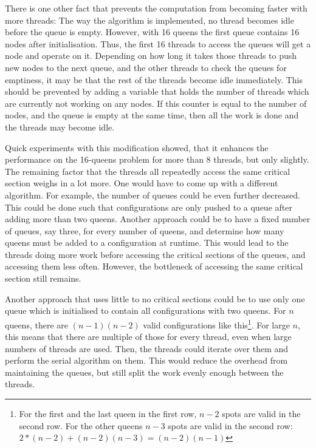 There is one other fact that prevents the computation from becoming faster with more threads:
The way the algorithm is implemented, no thread becomes idle before the queue is empty.
However, with 16 queens the first queue contains 16 nodes after initialisation.
Thus, the first 16 threads to access the queues will get a node and operate on it.
Depending on how long it takes those threads to push new nodes to the next queue, and the other threads to check the queues for emptiness, it may be that the rest of the threads become idle immediately.
This should be prevented by adding a variable that holds the number of threads which are currently not working on any nodes.
If this counter is equal to the number of nodes, and the queue is empty at the same time, then all the work is done and the threads may become idle.

Quick experiments with this modification showed, that it enhances the performance on the 16-queens problem for more than 8 threads, but only slightly.
The remaining factor that the threads all repeatedly access the same critical section weighs in a lot more.
One would have to come up with a different algorithm.
For example, the number of queues could be even further decreased.
This could be done such that configurations are only pushed to a queue after adding more than two queens.
Another approach could be to have a fixed number of queues, say three, for every number of queens, and determine how many queens must be added to a configuration at runtime.
This would lead to the threads doing more work before accessing the critical sections of the queues, and accessing them less often.
However, the bottleneck of accessing the same critical section still remains.

Another approach that uses little to no critical sections could be to use only one queue which is initialised to contain all configurations with two queens.
For $n$ queens, there are $(n-1)(n-2)$ valid configurations like this\footnote{For the first and the last queen in the first row, $n-2$ spots are valid in the second row. For the other queens $n-3$ spots are valid in the second row: $2*(n-2) + (n-2)(n-3)=(n-2)(n-1)$}.
For large $n$, this means that there are multiple of those for every thread, even when large numbers of threads are used.
Then, the threads could iterate over them and perform the serial algorithm on them.
This would reduce the overhead from maintaining the queues, but still split the work evenly enough between the threads.



